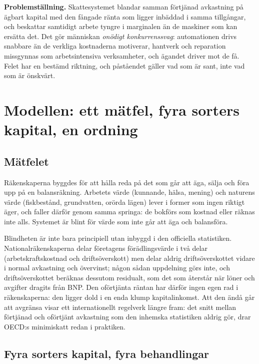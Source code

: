 \documentclass[11pt]{article}
\begin{document}
\medskip

\noindent\textbf{Problemställning.} Skattesystemet blandar samman förtjänad avkastning på ägbart kapital med den fångade ränta som ligger inbäddad i samma tillgångar, och beskattar samtidigt arbete tyngre i marginalen än de maskiner som kan ersätta det. Det gör människan \emph{onödigt konkurrenssvag}: automationen drivs snabbare än de verkliga kostnaderna motiverar, hantverk och reparation missgynnas som arbetsintensiva verksamheter, och ägandet driver mot de få. Felet har en bestämd riktning, och påståendet gäller vad som är sant, inte vad som är önskvärt.

\section{Modellen: ett mätfel, fyra sorters kapital, en ordning}

\subsection*{Mätfelet}

Räkenskaperna byggdes för att hålla reda på det som går att äga, sälja och föra upp på en balansräkning. Arbetets värde (kunnande, hälsa, mening) och naturens värde (fiskbestånd, grundvatten, orörda lägen) lever i former som ingen riktigt äger, och faller därför genom samma springa: de bokförs som kostnad eller räknas inte alls. Systemet är blint för värde som inte går att äga och balansföra.

Blindheten är inte bara principiell utan inbyggd i den officiella statistiken. Nationalräkenskaperna delar företagens förädlingsvärde i två delar (arbetskraftskostnad och driftsöverskott) men delar aldrig driftsöverskottet vidare i normal avkastning och övervinst; någon sådan uppdelning görs inte, och driftsöverskottet beräknas dessutom residualt, som det som återstår när löner och avgifter dragits från BNP. Den oförtjänta räntan har därför ingen egen rad i räkenskaperna: den ligger dold i en enda klump kapitalinkomst. Att den ändå går att avgränsa visar ett internationellt regelverk längre fram: det snitt mellan förtjänad och oförtjänt avkastning som den inhemska statistiken aldrig gör, drar OECD:s minimiskatt redan i praktiken.

\subsection*{Fyra sorters kapital, fyra behandlingar}
\end{document}
